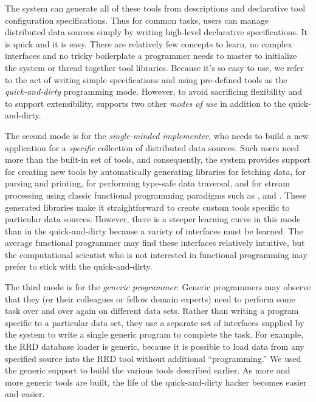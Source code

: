 
The system can generate all of these tools from \padsd{} descriptions
and declarative tool configuration specifications.  Thus for common
tasks, users can manage distributed data sources simply by writing
high-level declarative specifications.  It is quick and it is easy. There
are relatively few concepts to learn, no complex interfaces and no
tricky boilerplate a programmer needs to master to initialize 
the system or thread together tool libraries.  Because it's so
easy to use, we refer to the act of writing simple specifications
and using pre-defined tools as the {\em quick-and-dirty} \padsd{} programming
mode.  However, to avoid sacrificing flexibility and to support extensibility,
\padsd{} supports two other {\em modes of use} in addition to the 
quick-and-dirty.

The second mode is
for the {\em single-minded implementer}, who needs to build a new
application for a {\em specific} collection of distributed data
sources.  Such users need more than the built-in set of tools, 
and consequently, the system provides support for
creating new tools by automatically generating libraries for fetching
data, for parsing and printing, for performing type-safe data
traversal, and for stream processing using classic functional
programming paradigms such as ,  and .
These generated libraries make it straightforward to create custom tools
specific to particular data sources.  However, there is a steeper learning
curve in this mode than in the quick-and-dirty because a variety of
interfaces must be learned.  The average functional programmer may find
these interfaces relatively intuitive, but the computational scientist
who is not interested in functional programming may prefer to stick with
the quick-and-dirty. 

The third mode is for the {\em generic programmer}.  Generic
programmers may observe that they (or their colleagues or fellow domain
experts) need to perform some task over and over again on different
data sets.  Rather than writing a program specific to a particular
data set, they use a 
separate set of interfaces supplied by the \padsd{} system to write a
single generic program to complete the task.  For example, the RRD database
loader is generic, because it is possible to load data from any
specified source into the RRD tool without additional ``programming.''
We used the generic support to build the various tools described earlier.
As more and more generic tools are built, the life of the quick-and-dirty
hacker becomes easier and easier.


